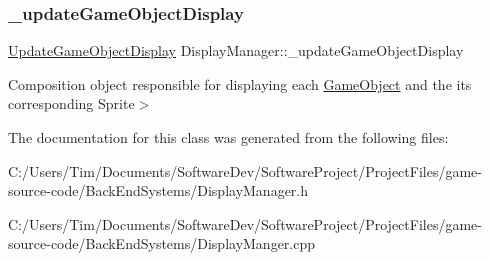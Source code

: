 \subsubsection{\texorpdfstring{\+\_\+update\+Game\+Object\+Display}{\_updateGameObjectDisplay}}
{\footnotesize\ttfamily \hyperlink{class_update_game_object_display}{Update\+Game\+Object\+Display} Display\+Manager\+::\+\_\+update\+Game\+Object\+Display\hspace{0.3cm}{\ttfamily [private]}}

Composition object responsible for displaying each \hyperlink{class_game_object}{Game\+Object} and the its corresponding Sprite$>$ 

The documentation for this class was generated from the following files\+:\begin{DoxyCompactItemize}
\item 
C\+:/\+Users/\+Tim/\+Documents/\+Software\+Dev/\+Software\+Project/\+Project\+Files/game-\/source-\/code/\+Back\+End\+Systems/Display\+Manager.\+h\item 
C\+:/\+Users/\+Tim/\+Documents/\+Software\+Dev/\+Software\+Project/\+Project\+Files/game-\/source-\/code/\+Back\+End\+Systems/Display\+Manger.\+cpp\end{DoxyCompactItemize}
